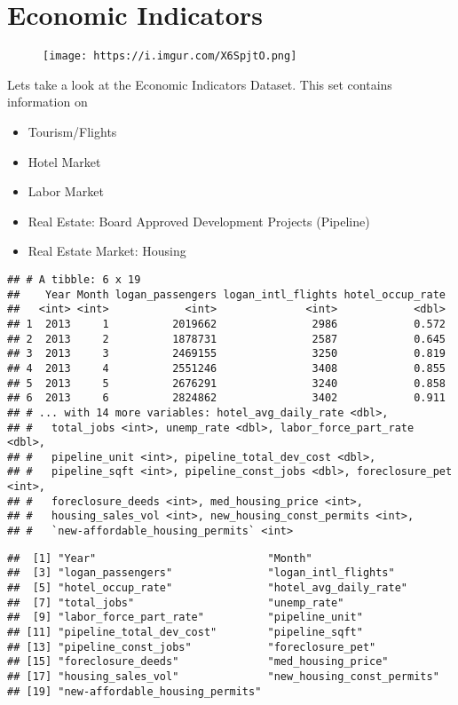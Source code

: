 \documentclass[]{article}
\providecommand{\tightlist}{%
  \setlength{\itemsep}{0pt}\setlength{\parskip}{0pt}}
\begin{document}
\newpage

\section{Economic Indicators}\label{economic-indicators-1}

\begin{figure}
\centering
\texttt{[image: https://i.imgur.com/X6SpjtO.png]}
\caption{}
\end{figure}

Lets take a look at the Economic Indicators Dataset. This set contains
information on

\begin{itemize}
\tightlist
\item
  Tourism/Flights
\item
  Hotel Market
\item
  Labor Market
\item
  Real Estate: Board Approved Development Projects (Pipeline)\\
\item
  Real Estate Market: Housing
\end{itemize}

\begin{verbatim}
## # A tibble: 6 x 19
##    Year Month logan_passengers logan_intl_flights hotel_occup_rate
##   <int> <int>            <int>              <int>            <dbl>
## 1  2013     1          2019662               2986            0.572
## 2  2013     2          1878731               2587            0.645
## 3  2013     3          2469155               3250            0.819
## 4  2013     4          2551246               3408            0.855
## 5  2013     5          2676291               3240            0.858
## 6  2013     6          2824862               3402            0.911
## # ... with 14 more variables: hotel_avg_daily_rate <dbl>,
## #   total_jobs <int>, unemp_rate <dbl>, labor_force_part_rate <dbl>,
## #   pipeline_unit <int>, pipeline_total_dev_cost <dbl>,
## #   pipeline_sqft <int>, pipeline_const_jobs <dbl>, foreclosure_pet <int>,
## #   foreclosure_deeds <int>, med_housing_price <int>,
## #   housing_sales_vol <int>, new_housing_const_permits <int>,
## #   `new-affordable_housing_permits` <int>
\end{verbatim}

\begin{verbatim}
##  [1] "Year"                           "Month"                         
##  [3] "logan_passengers"               "logan_intl_flights"            
##  [5] "hotel_occup_rate"               "hotel_avg_daily_rate"          
##  [7] "total_jobs"                     "unemp_rate"                    
##  [9] "labor_force_part_rate"          "pipeline_unit"                 
## [11] "pipeline_total_dev_cost"        "pipeline_sqft"                 
## [13] "pipeline_const_jobs"            "foreclosure_pet"               
## [15] "foreclosure_deeds"              "med_housing_price"             
## [17] "housing_sales_vol"              "new_housing_const_permits"     
## [19] "new-affordable_housing_permits"
\end{verbatim}
\end{document}

